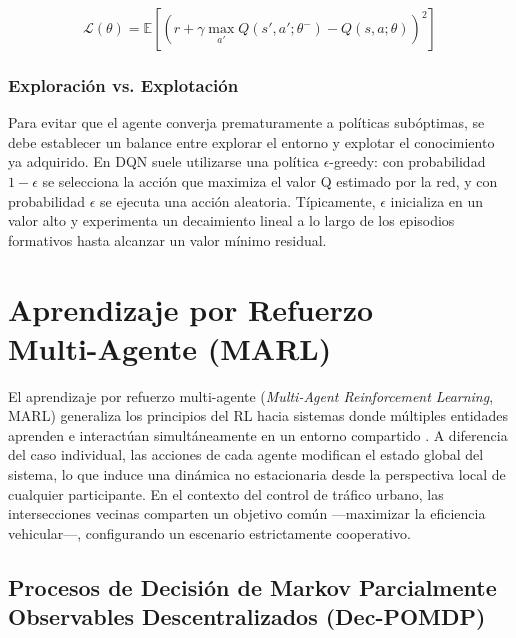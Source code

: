 \begin{equation}
\mathcal{L}(\theta) = \mathbb{E} \left[ \left( r + \gamma \max_{a'} Q(s', a'; \theta^{-}) - Q(s, a; \theta) \right)^2 \right]
\end{equation}

\subsubsection{Exploración vs. Explotación}

Para evitar que el agente converja prematuramente a políticas subóptimas, se debe establecer un balance entre explorar el entorno y explotar el conocimiento ya adquirido. En DQN suele utilizarse una política $\epsilon$-greedy: con probabilidad $1-\epsilon$ se selecciona la acción que maximiza el valor Q estimado por la red, y con probabilidad $\epsilon$ se ejecuta una acción aleatoria. Típicamente, $\epsilon$ inicializa en un valor alto y experimenta un decaimiento lineal a lo largo de los episodios formativos hasta alcanzar un valor mínimo residual.

\section[Aprendizaje por Refuerzo Multi-Agente (MARL)]{Aprendizaje por Refuerzo \\ Multi-Agente (MARL)}

El aprendizaje por refuerzo multi-agente (\textit{Multi-Agent Reinforcement Learning}, MARL) generaliza los principios del RL hacia sistemas donde múltiples entidades aprenden e interactúan simultáneamente en un entorno compartido \cite{marlbook}. A diferencia del caso individual, las acciones de cada agente modifican el estado global del sistema, lo que induce una dinámica no estacionaria desde la perspectiva local de cualquier participante. En el contexto del control de tráfico urbano, las intersecciones vecinas comparten un objetivo común ---maximizar la eficiencia vehicular---, configurando un escenario estrictamente cooperativo.

\subsection{Procesos de Decisión de Markov Parcialmente Observables Descentralizados (Dec-POMDP)}

